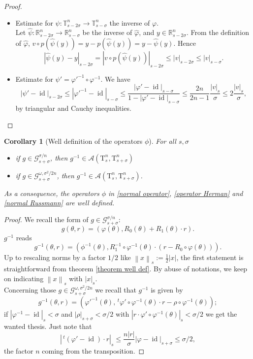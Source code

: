 \documentclass[oneside, 11pt]{amsbook}
\newcommand{\abs}[1]{{\left|#1\right|}}
\newcommand{\norm}[1]{{\left\|#1\right\|}}
\newcommand{\normal}{\mathrm}
\newcommand{\G}{\mathcal{G}}
\newcommand{\A}{\mathcal{A}}
\newcommand{\T}{\mathbb{T}}
\newcommand{\R}{\mathbb{R}}
\newcommand{\teta}{\theta}
\newcommand{\id}{\operatorname{id}}
\newcommand{\0}{{(0)}}
\newcommand{\3}{{(3)}}
\newtheorem{cor}{Corollary}
\numberwithin{equation}{section}
\numberwithin{defn}{section}
\numberwithin{prop}{section}
\numberwithin{cor}{section}
\numberwithin{lemma}{section}
\numberwithin{rmk}{section}
\numberwithin{corollary}{section}
\begin{document}
\begin{proof}
\begin{itemize}[leftmargin=*]
		\item Estimate for $\psi: \T^n_{s-2\sigma}\to \T^n_{s-\sigma}$ the inverse of $\varphi$.\\ Let $\hat\psi : \R^n_{s-2\sigma}\to\R^n_{s-\sigma}$ be the inverse of $\hat\varphi$, and $y\in\R^n_{s-2\sigma}.$ From the definition of $\hat\varphi$, $v\circ p(\hat\psi(y))= y - p(\hat\psi(y)) = y - \hat\psi(y)$. Hence \[\abs{\hat\psi(y) - y}_{s-2\sigma} = \abs{v\circ p (\hat \psi (y))}_{s-2\sigma}\leq \abs{v}_{s-2\sigma}\leq\abs{v}_{s-\sigma}.\]
		\item Estimate for $\psi' = \varphi'^{-1}\circ\varphi^{-1}$. We have \[\abs{\psi' - \id}_{s-2\sigma} \leq \abs{\varphi'^{-1} - \id}_{s-\sigma}\leq \frac{\abs{\varphi' - \id}_{s-\sigma}}{1 - \abs{\varphi' - \id}_{s-\sigma}}\leq \frac{2n}{2n -1}\frac{\abs{v}_s}{\sigma} \leq 2\frac{\abs{v}_s}{\sigma},\] by triangular and Cauchy inequalities.
	\end{itemize}
\end{proof}

\begin{cor}[Well definition of the operators $\phi$]
	\label{cor well def}For all $s,\sigma$
	\begin{itemize}[leftmargin=*]
		\item  if $g\in\G^{\sigma/n}_{s + \sigma}$, then $g^{-1}\in\A(\normal{T}^n_s,\normal{T}^n_{s+\sigma})$
		\item if $g\in\G^{\omega,\sigma^2/2n}_{s + \sigma}$, then $g^{-1}\in\A(\normal{T}^n_s,\normal{T}^n_{s+\sigma})$.
	\end{itemize}
	As a consequence, the operators $\phi$ in \eqref{normal operator}, \eqref{operator Herman} and \eqref{normal Russmann} are well defined.
\end{cor}
\begin{proof}
	We recall the form of $g\in\G^{\sigma/n}_{s+\sigma}$: \[g(\teta,r)= (\varphi(\teta), R_0(\teta) + R_1(\teta)\cdot r).\]
	$g^{-1}$ reads \[g^{-1}(\teta,r)=(\phi^{-1}(\teta), R_1^{-1}\circ\varphi^{-1}(\teta)\cdot(r - R_0\circ\varphi(\teta))).\]
	Up to rescaling norms by a factor $1/2$ like $\norm{x}_s := \frac{1}{2}\abs{x}$, the first statement is straightforward from theorem \ref{theorem well def}. By abuse of notations, we keep on indicating $\norm{x}_s$ with $\abs{x}_s$.\medskip\\
	Concerning those $g\in\G^{\omega,\sigma^2/2n}_{s+\sigma}$ we recall that $g^{-1}$ is given by
	\[g^{-1}(\teta,r)=(\varphi'^{-1}(\teta), \,^t\varphi'\circ\varphi^{-1}(\teta)\cdot r - \rho\circ\varphi^{-1}(\teta));\]
	if $\abs{\varphi^{-1} - \id}_{s}< \sigma$ and $\abs{\rho}_{s+\sigma}<\sigma/2$ with $\abs{r\cdot\varphi'\circ\varphi^{-1}(\teta)}_s < \sigma/2$ we get the wanted thesis. Just note that 
	\[\abs{\,^t(\varphi' - \id)\cdot r}_s \leq \frac{n\abs{r}}{\sigma}\abs{\varphi - \id}_{s+\sigma}\leq \sigma/2,\]
	the factor $n$ coming from the transposition. 
\end{proof}
\end{document}
